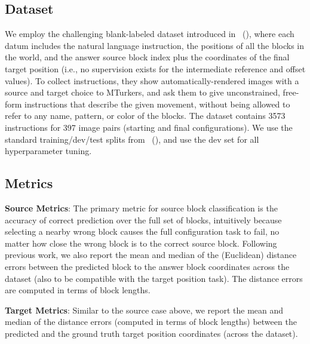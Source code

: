 \documentclass[letterpaper]{article} %
\newcommand{\newcite}[1]{\citeauthor{#1} (\citeyear{#1})}
\begin{document}
\subsection{Dataset}
We employ the challenging blank-labeled dataset introduced in~\newcite{bisk2016natural}, where each datum includes the natural language instruction, the positions of all the blocks in the world, and the answer source block index plus the coordinates of the final target position (i.e., no supervision exists for the intermediate reference and offset values). 
%
%
To collect instructions, they show automatically-rendered images with a source and target choice to MTurkers, and ask them to give unconstrained, free-form instructions that describe the given movement, without being allowed to refer to any name, pattern, or color of the blocks. 
The dataset contains 3573 instructions for 397 image pairs (starting and final configurations). 
%
We use the standard training/dev/test splits from~\newcite{bisk2016natural}, and use the dev set for all hyperparameter tuning.
 
\subsection{Metrics}

\noindent\textbf{Source Metrics}:
The primary metric for source block classification is the accuracy of correct prediction over the full set of blocks, intuitively because selecting a nearby wrong block causes the full configuration task to fail, no matter how close the wrong block is to the correct source block.
Following previous work, we also report the mean and median of the (Euclidean) distance errors between the predicted block to the answer block coordinates across the dataset (also to be compatible with the target position task). The distance errors are computed in terms of block lengths.


\noindent\textbf{Target Metrics}:
Similar to the source case above, we report the mean and median of the distance errors (computed in terms of block lengths) between the predicted and the ground truth target position coordinates (across the dataset). 
\end{document}
